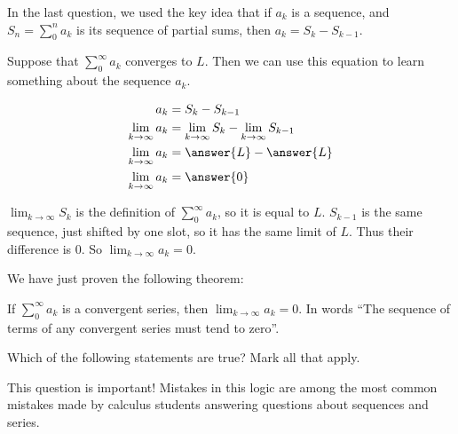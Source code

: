 \documentclass{ximera}
\begin{document}
\begin{explanation}
In the last question, we used the key idea that if $a_k$ is a sequence, and $S_n = \sum_0^n a_k $ is its sequence of partial sums, then $a_k = S_k-S_{k-1}$.

Suppose that $\sum_0^\infty a_k$ converges to $L$.  Then we can use this equation to learn something about the sequence $a_k$.

\begin{align*}
	a_k &= S_k-S_{k-1}\\
	\lim_{k \to \infty} a_k &= \lim_{k \to \infty} S_k -  \lim_{k \to \infty} S_{k-1}\\
	\lim_{k \to \infty} a_k &= \answer{L} - \answer{L}\\
	\lim_{k \to \infty} a_k &= \answer{0}
\end{align*}

\begin{hint}
	$\lim_{k \to \infty} S_{k}$ is the definition of $\sum_0^\infty a_k$, so it is equal to $L$.  $S_{k-1}$ is the same sequence, just shifted by one slot, so it has the same limit of $L$.  Thus their difference is $0$.  So $\lim_{k \to \infty} a_k = 0$.
\end{hint}
\end{explanation}

We have just proven the following theorem:

\begin{theorem}
	If $\sum_0^\infty a_k$ is a convergent series, then $\lim_{k \to \infty} a_k = 0$.  In words ``The sequence of terms of any convergent series must tend to zero''.
\end{theorem}

\begin{question}
Which of the following statements are true?  Mark all that apply.

\begin{multipleChoice}
\end{multipleChoice}


\begin{warning}
This question is important!  Mistakes in this logic are among the most common mistakes made by calculus students answering questions about sequences and series.
\end{warning}

\end{question}
\end{document}
